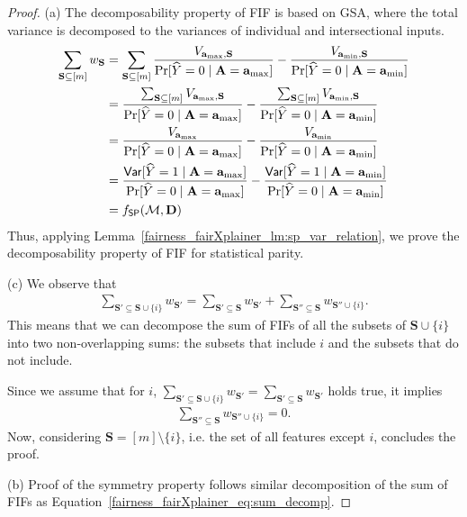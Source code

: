 \begin{proof}
	(a) The decomposability property of FIF is based on GSA, where the total variance is decomposed to the variances of individual and intersectional inputs. 
	\begin{align*}
	\sum_{\mathbf{S} \subseteq [m]} w_{\mathbf{S}} &= \sum_{\mathbf{S} \subseteq [m]} \frac{V_{\mathbf{a}_{\max}, \mathbf{S}}}{ \Pr[\widehat{Y} = 0 \mid  \mathbf{A} = \mathbf{a}_{\max}]} - \frac{V_{\mathbf{a}_{\min}, \mathbf{S}} }{\Pr[\widehat{Y} = 0 \mid  \mathbf{A} = \mathbf{a}_{\min}]}\\
	&= \frac{\sum_{\mathbf{S} \subseteq [m]} V_{\mathbf{a}_{\max}, \mathbf{S}}}{ \Pr[\widehat{Y} = 0 \mid  \mathbf{A} = \mathbf{a}_{\max}]} - \frac{\sum_{\mathbf{S} \subseteq [m]} V_{\mathbf{a}_{\min}, \mathbf{S}} }{\Pr[\widehat{Y} = 0 \mid  \mathbf{A} = \mathbf{a}_{\min}]}\\
	&= \frac{V_{\mathbf{a}_{\max}}}{ \Pr[\widehat{Y} = 0 \mid  \mathbf{A} = \mathbf{a}_{\max}]} - \frac{V_{\mathbf{a}_{\min}} }{\Pr[\widehat{Y} = 0 \mid  \mathbf{A} = \mathbf{a}_{\min}]}\\
	&=\frac{\mathsf{Var}[\widehat{Y} = 1\mid\mathbf{A} = \mathbf{a}_{\max}]}{\Pr[\widehat{Y} = 0 \mid  \mathbf{A} = \mathbf{a}_{\max}]} - \frac{\mathsf{Var}[\widehat{Y} = 1\mid\mathbf{A} = \mathbf{a}_{\min}] }{\Pr[\widehat{Y} = 0 \mid  \mathbf{A} = \mathbf{a}_{\min}]}\\
	&= f_{\mathsf{SP}}(\mathcal{M}, \mathbf{D})
	\end{align*}
	Thus, applying Lemma~\ref{fairness_fairXplainer_lm:sp_var_relation}, we prove the decomposability property of FIF for statistical parity.
	
	(c) We observe that 
	\begin{align}\label{fairness_fairXplainer_eq:sum_decomp}
		\sum_{\mathbf{S}' \subseteq \mathbf{S}\cup \{i\}} w_{\mathbf{S}'} = \sum_{\mathbf{S}' \subseteq \mathbf{S}} w_{\mathbf{S}'} + \sum_{\mathbf{S}'' \subseteq \mathbf{S}} w_{\mathbf{S}''\cup \{i\}}.
	\end{align}
	This means that we can decompose the sum of FIFs of all the subsets of $\mathbf{S}\cup \{i\}$ into two non-overlapping sums: the subsets that include $i$ and the subsets that do not include.
	
	Since we assume that for $i$,  $\sum_{\mathbf{S}' \subseteq \mathbf{S}\cup \{i\}} w_{\mathbf{S}'} = \sum_{\mathbf{S}' \subseteq \mathbf{S}} w_{\mathbf{S}'}$ holds true, it implies
		\begin{align*}
	\sum_{\mathbf{S}'' \subseteq \mathbf{S}} w_{\mathbf{S}''\cup \{i\}} = 0.
	\end{align*}
	Now, considering $\mathbf{S} = [m]\setminus \{i\}$, i.e. the set of all features  except $i$, concludes the proof.
	
	(b) Proof of the symmetry property follows similar decomposition of the sum of FIFs as Equation~\eqref{fairness_fairXplainer_eq:sum_decomp}.
\end{proof}

